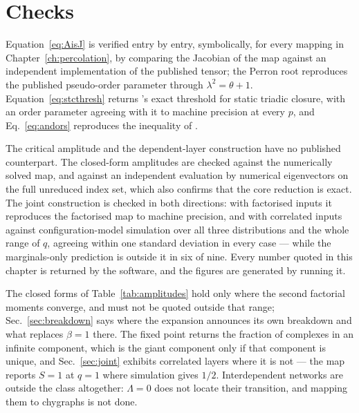 \section{Checks}
\label{sec:giant-checks}

Equation~\eqref{eq:AisJ} is verified entry by entry, symbolically, for every
mapping in Chapter~\ref{ch:percolation}, by comparing the Jacobian of the map
against an independent implementation of the published tensor; the Perron root
reproduces the published pseudo-order parameter through
$\lambda^{2}=\theta+1$. Equation~\eqref{eq:stcthresh} returns
\citeauthor{cirigliano2025}'s exact threshold for static triadic closure, with
an order parameter agreeing with it to machine precision at every $p$, and
Eq.~\eqref{eq:andors} reproduces the inequality of \citet{bianconi2024}.

The critical amplitude and the dependent-layer construction have no published
counterpart. The closed-form amplitudes are checked against the numerically
solved map, and against an independent evaluation by numerical eigenvectors on
the full unreduced index set, which also confirms that the core reduction is
exact. The joint construction is checked in both directions: with factorised
inputs it reproduces the factorised map to machine precision, and with
correlated inputs against configuration-model simulation over all three
distributions and the whole range of $q$, agreeing within one standard deviation
in every case --- while the marginals-only prediction is outside it in six of
nine. Every number quoted in this chapter is returned by the software, and the
figures are generated by running it.

The closed forms of Table~\ref{tab:amplitudes} hold only where the second
factorial moments converge, and must not be quoted outside that range;
Sec.~\ref{sec:breakdown} says where the expansion announces its own breakdown
and what replaces $\beta=1$ there. The fixed point returns the fraction of
complexes in an infinite component, which is the giant component only if that
component is unique, and Sec.~\ref{sec:joint} exhibits correlated layers where
it is not --- the map reports $S=1$ at $q=1$ where simulation gives $1/2$.
Interdependent networks are outside the class altogether: $\Lambda=0$ does not
locate their transition, and mapping them to chygraphs is not done.
